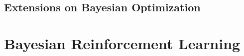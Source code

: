 \subsection{Extensions on Bayesian Optimization}
\label{sec:bayesian-optimization-extensions}
\blindtext

\section{Bayesian Reinforcement Learning}
\label{sec:bayesian-reinforcement-learning}

% 

%
%
